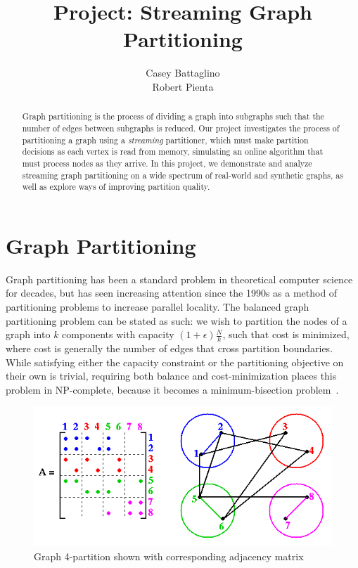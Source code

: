 \documentclass[11pt]{article}
\title{Project: Streaming Graph Partitioning}
\author{Casey Battaglino\\Robert Pienta}
\begin{document}
\maketitle

\begin{abstract}
Graph partitioning is the process of dividing a graph into subgraphs such that the number of edges between subgraphs is reduced. Our project investigates the process of partitioning a graph using a \emph{streaming} partitioner, which must make partition decisions as each vertex is read from memory, simulating an online algorithm that must process nodes as they arrive. In this project, we demonstrate and analyze streaming graph partitioning on a wide spectrum of real-world and synthetic graphs, as well as explore ways of improving partition quality. 
\end{abstract}

\section{Graph Partitioning} \vspace{-10 pt}
Graph partitioning has been a standard problem in theoretical computer science for decades, but has seen increasing attention since the 1990s as a method of partitioning problems to increase parallel locality. The balanced graph partitioning problem can be stated as such: we wish to partition the nodes of a graph into $k$ components with capacity $(1+\epsilon)\frac{N}{k}$, such that cost is minimized, where cost is generally the number of edges that cross partition boundaries. While satisfying either the capacity constraint or the partitioning objective on their own is trivial, requiring both balance and cost-minimization places this problem in NP-complete, because it becomes a minimum-bisection problem~\cite{Garey:1979:CIG:578533}.

\begin{figure}[ht]
\centering
\includegraphics[scale=.60] {figures/graphpart.png}
\caption[Caption for]{Graph 4-partition shown with corresponding adjacency matrix \footnotemark}
\label{fig:0}
\end{figure}
\end{document}
